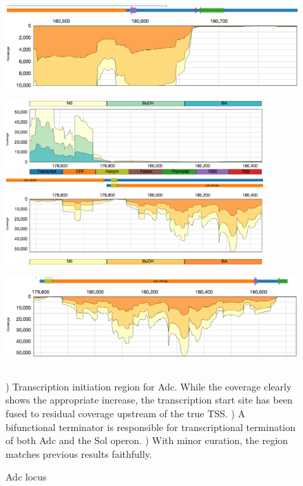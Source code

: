 \begin{figure}
\small
{\includegraphics[width=\textwidth,height=1.5in]{images/Assembly/Examples/Sol/Adc-TSS.png}
\label{fig:2a}}
{\includegraphics[width=\textwidth,height=2.5in]{images/Assembly/Examples/Sol/Sol-bifunctional-terminator.png}
\label{fig:2b}}
{\includegraphics[width=\textwidth,height=1.5in]{images/Assembly/Examples/Sol/Adc-curated.png}
\label{fig:2c}}
\caption{Adc locus}
) Transcription initiation region for Adc. While the coverage clearly shows the appropriate increase, the transcription start site has been fused to residual coverage upstream of the true TSS. ) A bifunctional terminator is responsible for transcriptional termination of both Adc and the Sol operon. ) With minor curation, the region matches previous results faithfully.
\label{fig2}
\end{figure}


